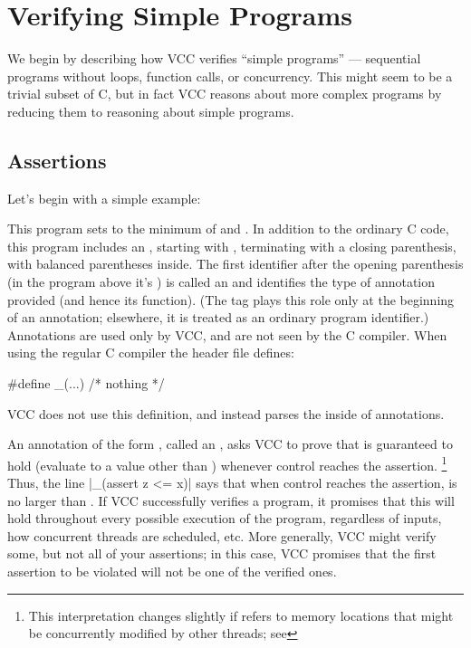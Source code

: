 \section{Verifying Simple Programs}
We begin by describing how VCC verifies ``simple programs'' ---
sequential programs without loops,  function calls, or concurrency. This
might seem to be a trivial subset of C, but in fact VCC reasons about
more complex programs by reducing them to reasoning about simple programs.

\subsection{Assertions}
\label{sect:assert-assume}

Let's begin with a simple example:

This program sets  to the minimum of  and
. In addition to the ordinary C code, this program includes an
, starting with \vcc{_(}, terminating with a closing
parenthesis, with balanced parentheses inside. The first identifier
after the opening parenthesis (in the program above it's )
is called an  and
identifies the type of annotation provided (and hence its function).
(The tag plays this role only 
at the beginning of an annotation; elsewhere, it is treated as
an ordinary program identifier.)
Annotations are used only by VCC, and are not seen by the C compiler.
When using the regular C compiler the  header file defines:
\begin{VCC}
#define _(...) /* nothing */
\end{VCC}
VCC does not use this definition, and instead parses the inside of 
annotations.


An annotation of the form , called an , asks VCC to prove that
 is guaranteed to hold (\ie evaluate to a value other than )
whenever control reaches the assertion.%
\footnote{
  This interpretation changes slightly if  refers to
  memory locations that might be concurrently modified by other
  threads; see }  
Thus, the line \vcc|_(assert z <= x)| says
that when control reaches the assertion,  is no larger than .
If VCC successfully verifies a program, it promises that this will hold throughout 
every possible execution of the program, regardless of inputs, how concurrent
threads are scheduled, etc. More generally, VCC might verify some, but not all of your assertions; 
in this case, VCC promises that the first assertion to be violated will not be one of the verified ones.

